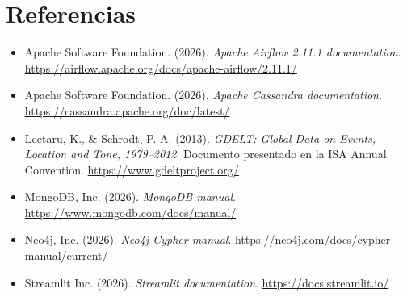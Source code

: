 \documentclass[11pt,a4paper]{article}
\begin{document}
\renewcommand{\thefootnote}{\fnsymbol{footnote}}

\section*{Referencias}

\begin{itemize}[leftmargin=1.2cm, itemsep=4pt]
    \item Apache Software Foundation. (2026). \textit{Apache Airflow 2.11.1 documentation}. \url{https://airflow.apache.org/docs/apache-airflow/2.11.1/}
    \item Apache Software Foundation. (2026). \textit{Apache Cassandra documentation}. \url{https://cassandra.apache.org/doc/latest/}
    \item Leetaru, K., \& Schrodt, P. A. (2013). \textit{GDELT: Global Data on Events, Location and Tone, 1979--2012}. Documento presentado en la ISA Annual Convention. \url{https://www.gdeltproject.org/}
    \item MongoDB, Inc. (2026). \textit{MongoDB manual}. \url{https://www.mongodb.com/docs/manual/}
    \item Neo4j, Inc. (2026). \textit{Neo4j Cypher manual}. \url{https://neo4j.com/docs/cypher-manual/current/}
    \item Streamlit Inc. (2026). \textit{Streamlit documentation}. \url{https://docs.streamlit.io/}
\end{itemize}
\end{document}
